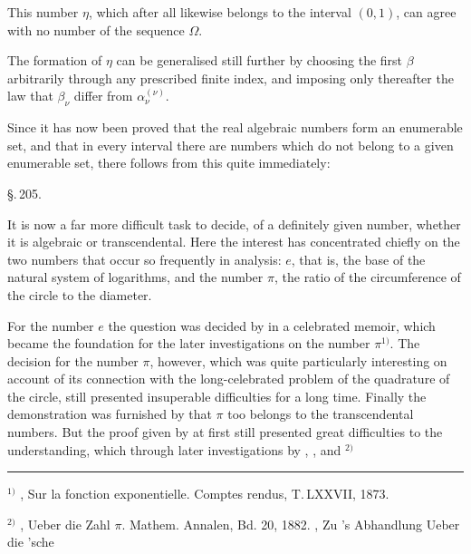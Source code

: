 
This number $\eta$, which after all likewise belongs to the interval $(0, 1)$, can agree with no number of the sequence $\Omega$.

The formation of $\eta$ can be generalised still further by choosing the first $\beta$ arbitrarily through any prescribed finite index, and imposing only thereafter the law that $\beta_\nu$ differ from $\alpha_\nu^{(\nu)}$.

Since it has now been proved that the real algebraic numbers form an enumerable set, and that in every interval there are numbers which do not belong to a given enumerable set, there follows from this quite immediately:

\begin{center}
\end{center}

\begin{center}
\S.\,205.

\end{center}

It is now a far more difficult task to decide, of a definitely given number, whether it is algebraic or transcendental. Here the interest has concentrated chiefly on the two numbers that occur so frequently in analysis: $e$, that is, the base of the natural system of logarithms, and the  number $\pi$, the ratio of the circumference of the circle to the diameter.

For the number $e$ the question was decided by  in a celebrated memoir, which became the foundation for the later investigations on the number $\pi$$^{1)}$. The decision for the number $\pi$, however, which was quite particularly interesting on account of its connection with the long-celebrated problem of the quadrature of the circle, still presented insuperable difficulties for a long time. Finally the demonstration was furnished by  that $\pi$ too belongs to the transcendental numbers. But the proof given by  at first still presented great difficulties to the understanding, which through later investigations by , ,  and $^{2)}$

\noindent\rule{4cm}{0.4pt}

$^{1)}$ , Sur la fonction exponentielle. Comptes rendus, T.\,LXXVII, 1873.

$^{2)}$ , Ueber die Zahl $\pi$. Mathem. Annalen, Bd. 20, 1882. , Zu 's Abhandlung \glqq Ueber die 'sche
